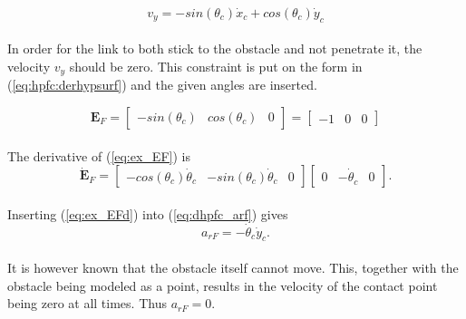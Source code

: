 \begin{equation}
    v_y = - sin(\theta_c) \dot{x}_c + cos(\theta_c) \dot{y}_c
\end{equation}
\\
In order for the link to both stick to the obstacle and not penetrate it, the velocity $v_y$ should be zero. This constraint is put on the form in (\ref{eq:hpfc:derhypsurf}) and the given angles are inserted.

\begin{equation}\label{eq:ex_EF}
    \mathbf{E}_F = 
    \begin{bmatrix}
        - sin(\theta_c) & cos(\theta_c) & 0
    \end{bmatrix}
    =
    \begin{bmatrix}
        - 1 & 0 & 0
    \end{bmatrix}
\end{equation}
\\
The derivative of (\ref{eq:ex_EF}) is
\begin{equation}\label{eq:ex_EFd}
    \mathbf{\dot{E}}_F = 
    \begin{bmatrix}
        -cos(\theta_c) \dot{\theta}_c & - sin(\theta_c) \dot{\theta}_c & 0
    \end{bmatrix}
    \begin{bmatrix}
        0 & -\dot{\theta}_c & 0
    \end{bmatrix}.
\end{equation}
\\
Inserting (\ref{eq:ex_EFd}) into (\ref{eq:dhpfc_arf}) gives
\begin{equation}
    a_{rF} = -\dot{\theta}_c \dot{y}_c.
\end{equation}
\\
It is however known that the obstacle itself cannot move. This, together with the obstacle being modeled as a point, results in the velocity of the contact point being zero at all times. Thus $a_{rF}=0$.

